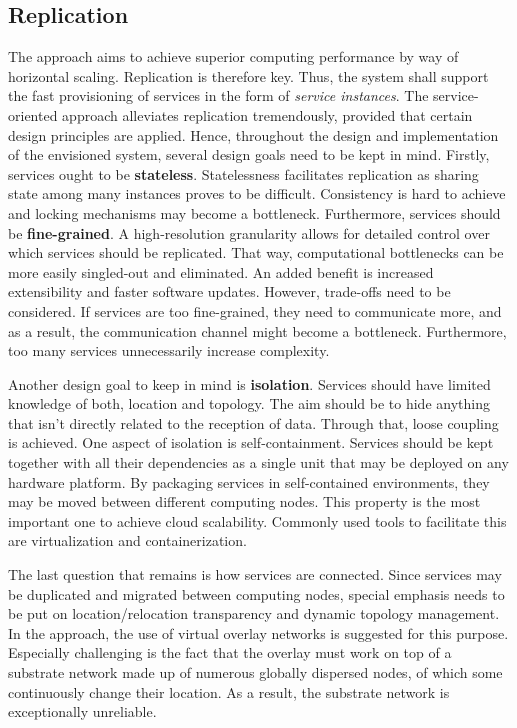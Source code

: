 \subsection{Replication}
The approach aims to achieve superior computing performance by way of horizontal scaling. Replication is therefore key. Thus, the system shall support the fast provisioning of services in the form of \emph{service instances}. The service-oriented approach alleviates replication tremendously, provided that certain design principles are applied. Hence, throughout the design and implementation of the envisioned system, several design goals need to be kept in mind. Firstly, services ought to be \textbf{stateless}. Statelessness facilitates replication as sharing state among many instances proves to be difficult. Consistency is hard to achieve and locking mechanisms may become a bottleneck. Furthermore, services should be \textbf{fine-grained}. A high-resolution granularity allows for detailed control over which services should be replicated. That way, computational bottlenecks can be more easily singled-out and eliminated. An added benefit is increased extensibility and faster software updates. However, trade-offs need to be considered. If services are too fine-grained, they need to communicate more, and as a result, the communication channel might become a bottleneck. Furthermore, too many services unnecessarily increase complexity.

Another design goal to keep in mind is \textbf{isolation}. Services should have limited knowledge of both, location and topology. The aim should be to hide anything that isn't directly related to the reception of data. Through that, loose coupling is achieved. One aspect of isolation is self-containment. Services should be kept together with all their dependencies as a single unit that may be deployed on any hardware platform. By packaging services in self-contained environments, they may be moved between different computing nodes. This property is the most important one to achieve cloud scalability. Commonly used tools to facilitate this are virtualization and containerization.

The last question that remains is how services are connected. Since services may be duplicated and migrated between computing nodes, special emphasis needs to be put on location/relocation transparency and dynamic topology management. In the approach, the use of virtual overlay networks is suggested for this purpose. Especially challenging is the fact that the overlay must work on top of a substrate network made up of numerous globally dispersed nodes, of which some continuously change their location. As a result, the substrate network is exceptionally unreliable.

